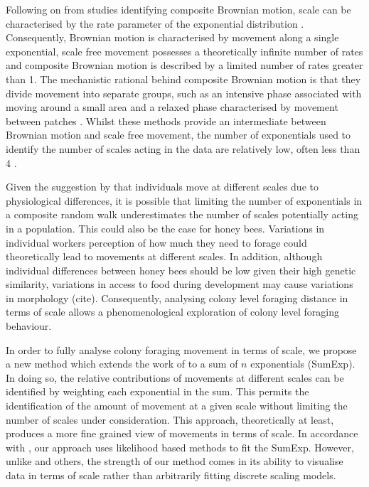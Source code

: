 \documentclass[11pt,usenames,dvipsnames]{article}
\begin{document}
Following on from studies identifying composite Brownian motion, scale can be characterised by the rate parameter of the exponential distribution \citep{Petrovskii2011}. Consequently, Brownian motion is characterised by movement along a single exponential, scale free movement possesses a theoretically infinite number of rates and composite Brownian motion is described by a limited number of rates greater than 1. The mechanistic rational behind composite Brownian motion is that they divide movement into separate groups, such as an intensive phase associated with moving around a small area and a relaxed phase characterised by movement between patches \citep{Auger-Methe2015}. Whilst these methods provide an intermediate between Brownian motion and scale free movement, the number of exponentials used to identify the number of scales acting in the data are relatively low, often less than 4 \citep{Sakamoto2017, Zhao2016}. 

Given the suggestion by \cite{Petrovskii2011} that individuals move at different scales due to physiological differences, it is possible that limiting the number of exponentials in a composite random walk underestimates the number of scales potentially acting in a population. This could also be the case for honey bees. Variations in individual workers perception of how much they need to forage could theoretically lead to movements at different scales. In addition, although individual differences between honey bees should be low given their high genetic similarity, variations in access to food during development may cause variations in morphology (cite). Consequently, analysing colony level foraging distance in terms of scale allows a phenomenological exploration of colony level foraging behaviour. 

In order to fully analyse colony foraging movement in terms of scale, we propose a new method which extends the work of \cite{Petrovskii2011} to a sum of $n$ exponentials (SumExp). In doing so, the relative contributions of movements at different scales can be identified by weighting each exponential in the sum. This permits the identification of the amount of movement at a given scale without limiting the number of scales under consideration. This approach, theoretically at least, produces a more fine grained view of movements in terms of scale. In accordance with \cite{Murphy2007}, our approach uses likelihood based methods to fit the SumExp. However, unlike \cite{Petrovskii2011} and others, the strength of our method comes in its ability to visualise data in terms of scale rather than arbitrarily fitting discrete scaling models.
\end{document}
